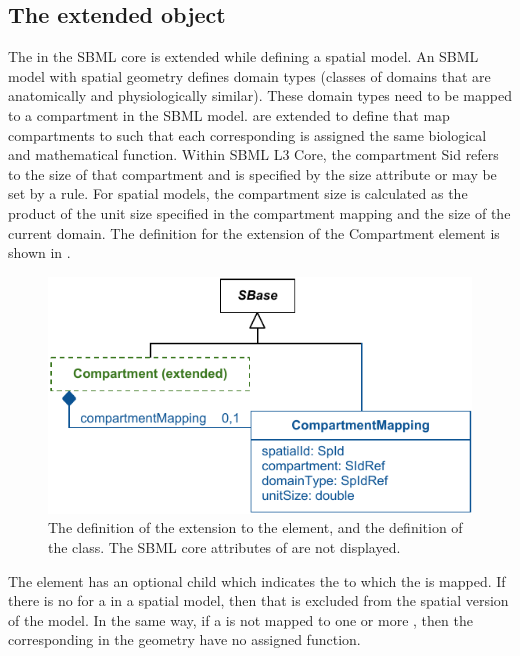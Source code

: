 \subsection{The extended \Compartment object}
\label{extended-compartment-class}

The \Compartment in the SBML core is extended while defining a spatial model. An SBML model with spatial geometry defines domain types (classes of domains that are anatomically and physiologically similar). These domain types need to be mapped to a compartment in the SBML model. \Compartments are extended to define \CompartmentMappings that map compartments to \DomainTypes such that each corresponding \DomainType is assigned the same biological and mathematical function. Within SBML L3 Core, the compartment Sid refers to the size of that compartment and is specified by the size attribute or may be set by a rule.  For spatial models, the compartment size is calculated as the product of the unit size specified in the compartment mapping and the size of the current domain. The definition for the extension of the Compartment element is shown in .
 
\begin{figure}[ht]
  \includegraphics{figs/extended-compartment-uml}
  \caption{The definition of the extension to the \Compartment element, and the definition of the \CompartmentMapping class. The SBML core attributes of \Compartment are not displayed.}
  \label{compartment-uml}
  \label{CompartmentMapping-uml}
\end{figure}



The \Compartment element has an optional \CompartmentMapping child which indicates the \DomainType to which the \Compartment is mapped.  If there is no \CompartmentMapping for a \Compartment in a spatial model, then that \Compartment is excluded from the spatial version of the model.  In the same way, if a \DomainType is not mapped to one or more \Compartments, then the corresponding \Domains in the geometry have no assigned function.


